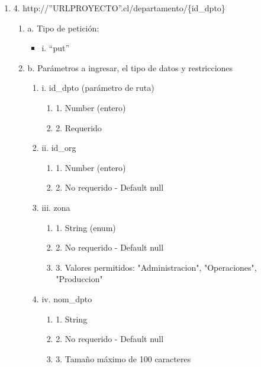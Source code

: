 \begin{enumerate}
    \item 4. http://”URLPROYECTO”.cl/departamento/\{id\_dpto\}
    \begin{enumerate}
        \item a. Tipo de petición:
            \begin{itemize}
               \item i. “put”
            \end{itemize}
        \item b. Parámetros a ingresar, el tipo de datos y restricciones
            \begin{enumerate}
                \item i. id\_dpto (parámetro de ruta)
                    \begin{enumerate}
                        \item 1. Number (entero)
                        \item 2. Requerido
                    \end{enumerate}
                \item ii. id\_org
                    \begin{enumerate}
                        \item 1. Number (entero)
                        \item 2. No requerido - Default null
                    \end{enumerate}
                \item iii. zona
                    \begin{enumerate}
                        \item 1. String (enum)
                        \item 2. No requerido - Default null
                        \item 3. Valores permitidos: "Administracion", "Operaciones", "Produccion"
                    \end{enumerate}
                \item iv. nom\_dpto
                    \begin{enumerate}
                        \item 1. String
                        \item 2. No requerido - Default null
                        \item 3. Tamaño máximo de 100 caracteres
                    \end{enumerate}
            \end{enumerate}
    \end{enumerate}
\end{enumerate}

